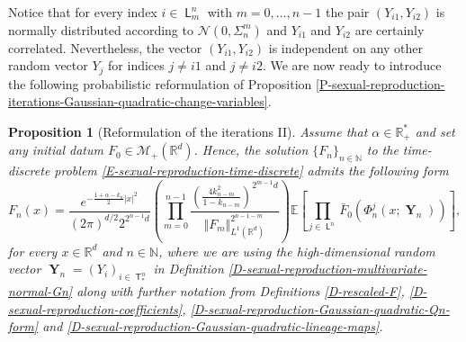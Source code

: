 \documentclass[reqno]{amsart}
\newtheorem{proposition}[definition]{Proposition}
\DeclareMathOperator{\Tree}{\mathsf{T}}
\DeclareMathOperator{\Leaves}{\mathsf{L}}
\DeclareMathOperator{\Level}{\mathsf{L}}
\DeclareMathOperator{\bY}{\mathbf{Y}}
\numberwithin{equation}{section}
\begin{document}
{Notice that for every index $i\in \Level_m^n$ with $m=0,\ldots,n-1$ the pair $(Y_{i1},Y_{i2})$ is normally distributed according to $\mathcal{N}(0,\Sigma_n^m)$ and $Y_{i1}$ and $Y_{i2}$ are certainly correlated. Nevertheless, the vector $(Y_{i1},Y_{i2})$ is independent on any other random vector $Y_j$ for indices $j\neq i1$ and $j\neq i2$. We are now ready to introduce the following probabilistic reformulation of  Proposition \ref{P-sexual-reproduction-iterations-Gaussian-quadratic-change-variables}.

\begin{proposition}[Reformulation of the iterations II]\label{P-iterative-method-sexual-reproduction}
Assume that $\alpha\in \mathbb{R}_+^*$ and set any initial datum $F_0\in \mathcal{M}_+(\mathbb{R}^d)$. Hence, the solution $\{F_n\}_{n\in \mathbb{N}}$ to the time-discrete problem \eqref{E-sexual-reproduction-time-discrete} admits the following form
\begin{equation}\label{E-sexual-Gaussian-quadratic-emF}
F_n(x)=\frac{e^{-\frac{1+\alpha-k_n}{2}\vert x\vert^2}}{(2\pi)^{d/2}2^{2^{n-1}d}}\left(\prod_{m=0}^{n-1}\frac{\left(\frac{4k_{n-m}^2}{1-k_{n-m}}\right)^{2^{m-1}d}}{\Vert F_m\Vert_{L^1(\mathbb{R}^d)}^{2^{n-1-m}}}\right)\mathbb{E}\left[\prod_{j\in \Leaves^n} \bar{F}_0(\Phi^j_n(x;\bY_n))\right],
\end{equation}
for every $x\in \mathbb{R}^d$ and $n\in \mathbb{N}$, where we are using the high-dimensional random vector $\bY_n=(Y_i)_{i\in \Tree^n_*}$ in Definition \ref{D-sexual-reproduction-multivariate-normal-Gn} along with further notation from Definitions \ref{D-rescaled-F}, \ref{D-sexual-reproduction-coefficients}, \ref{D-sexual-reproduction-Gaussian-quadratic-Qn-form} and \ref{D-sexual-reproduction-Gaussian-quadratic-lineage-maps}.
\end{proposition}

}
\end{document}
